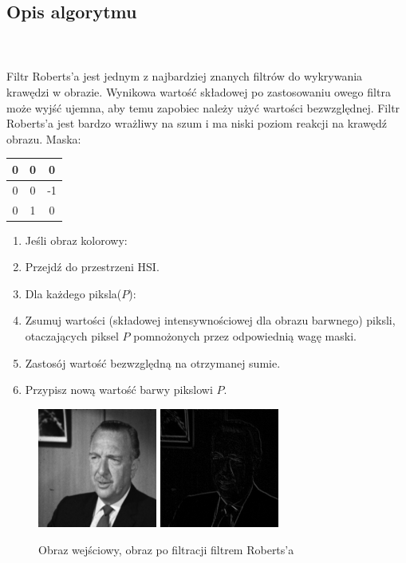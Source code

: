 \documentclass[final,a4paper,openany,12pt]{mwbk}
\begin{document}
\subsection*{Opis algorytmu}
\hfill
\\\\
\indent Filtr Roberts'a jest jednym z najbardziej znanych filtrów do wykrywania krawędzi w obrazie. Wynikowa wartość składowej po zastosowaniu owego filtra może wyjść ujemna, aby temu zapobiec należy użyć wartości bezwzględnej. Filtr Roberts'a jest bardzo wrażliwy na szum i ma niski poziom reakcji na krawędź obrazu. Maska:
\begin{center}
	\begin{tabular}{|c|c|c|}
		\hline
		0 & 0 & 0\\
		\hline
		0 & 0 & -1\\
		\hline
		0 & 1 & 0\\
		\hline
	\end{tabular}
\end{center}

\begin{enumerate}
	\item Jeśli obraz kolorowy:
	\item Przejdź do przestrzeni HSI.
	\item Dla każdego piksla($P$):
	\item Zsumuj wartości (składowej intensywnościowej dla obrazu barwnego) piksli, otaczających piksel $P$ pomnożonych przez odpowiednią wagę maski.
	\item Zastosój wartość bezwzględną na otrzymanej sumie.
	\item Przypisz nową wartość barwy pikslowi $P$.
\end{enumerate}

\begin{figure}[H]
	\begin{center}
		\includegraphics[width=0.35\textwidth]{gentelman_gray}
		\includegraphics[width=0.35\textwidth]{gentelman_gray_highpassRoberts_result}
	\end{center}
	\caption{Obraz wejściowy, obraz po filtracji filtrem Roberts'a}
\end{figure}
\end{document}
